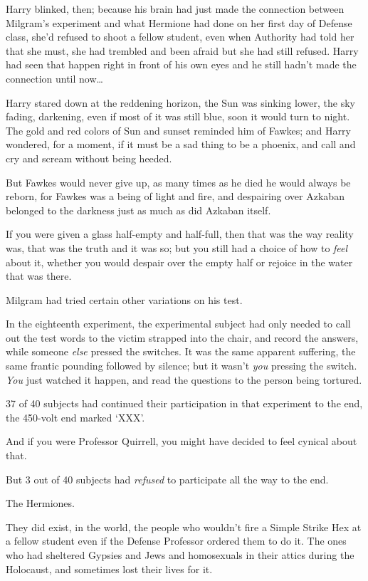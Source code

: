 Harry blinked, then; because his brain had just made the connection between 
Milgram's experiment and what Hermione had done on her first day of Defense 
class, she'd refused to shoot a fellow student, even when Authority had told 
her that she must, she had trembled and been afraid but she had still refused. 
Harry had seen that happen right in front of his own eyes and he still hadn't 
made the connection until now{\ldots}

Harry stared down at the reddening horizon, the Sun was sinking lower, the sky 
fading, darkening, even if most of it was still blue, soon it would turn to 
night. The gold and red colors of Sun and sunset reminded him of Fawkes; and 
Harry wondered, for a moment, if it must be a sad thing to be a phoenix, and 
call and cry and scream without being heeded.

But Fawkes would never give up, as many times as he died he would always be 
reborn, for Fawkes was a being of light and fire, and despairing over Azkaban 
belonged to the darkness just as much as did Azkaban itself.

If you were given a glass half-empty and half-full, then that was the way 
reality was, that was the truth and it was so; but you still had a choice of 
how to \emph{feel} about it, whether you would despair over the empty half or 
rejoice in the water that was there.

Milgram had tried certain other variations on his test.

In the eighteenth experiment, the experimental subject had only needed to call 
out the test words to the victim strapped into the chair, and record the 
answers, while someone \emph{else} pressed the switches. It was the same 
apparent suffering, the same frantic pounding followed by silence; but it 
wasn't \emph{you} pressing the switch. \emph{You} just watched it happen, and 
read the questions to the person being tortured.

37 of 40 subjects had continued their participation in that experiment to the 
end, the 450-volt end marked `XXX'.

And if you were Professor Quirrell, you might have decided to feel cynical 
about that.

But 3 out of 40 subjects had \emph{refused} to participate all the way to the 
end.

The Hermiones.

They did exist, in the world, the people who wouldn't fire a Simple Strike Hex 
at a fellow student even if the Defense Professor ordered them to do it. The 
ones who had sheltered Gypsies and Jews and homosexuals in their attics during 
the Holocaust, and sometimes lost their lives for it.

